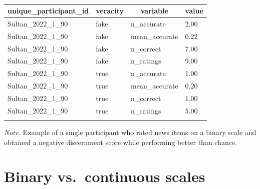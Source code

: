 \documentclass[
  doc,floatsintext]{apa6}
\begin{document}
\begin{table}[tbp]

\begin{center}
\begin{threeparttable}

\caption{\label{tab:single-participant-example}}

\begin{tabular}{llll}
\toprule
unique\_participant\_id & \multicolumn{1}{c}{veracity} & \multicolumn{1}{c}{variable} & \multicolumn{1}{c}{value}\\
\midrule
Sultan\_2022\_1\_90 & fake & n\_accurate & 2.00\\
Sultan\_2022\_1\_90 & fake & mean\_accurate & 0.22\\
Sultan\_2022\_1\_90 & fake & n\_correct & 7.00\\
Sultan\_2022\_1\_90 & fake & n\_ratings & 9.00\\
Sultan\_2022\_1\_90 & true & n\_accurate & 1.00\\
Sultan\_2022\_1\_90 & true & mean\_accurate & 0.20\\
Sultan\_2022\_1\_90 & true & n\_correct & 1.00\\
Sultan\_2022\_1\_90 & true & n\_ratings & 5.00\\
\bottomrule
\addlinespace
\end{tabular}

\begin{tablenotes}[para]
\normalsize{\textit{Note.} Example of a single participant who rated news items on a binary scale and obtained a negative discernment score while performing better than chance.}
\end{tablenotes}

\end{threeparttable}
\end{center}

\end{table}

\clearpage

\section{Binary vs.~continuous scales}\label{binary}

\FloatBarrier
\end{document}
